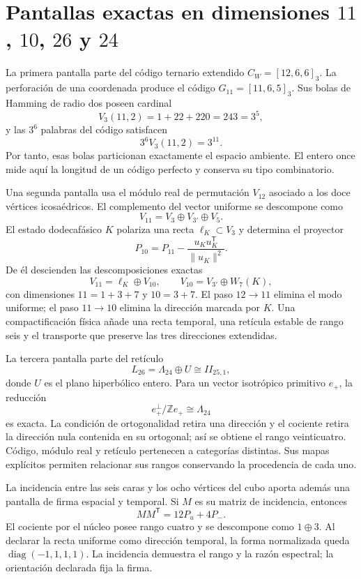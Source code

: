 \section{Pantallas exactas en dimensiones \(11\), \(10\), \(26\) y \(24\)}

La primera pantalla parte del código ternario extendido
\(C_W=[12,6,6]_3\). La perforación de una coordenada produce el código
\(G_{11}=[11,6,5]_3\). Sus bolas de Hamming de radio dos poseen cardinal
\[
 V_3(11,2)=1+22+220=243=3^5,
\]
y las \(3^6\) palabras del código satisfacen
\[
 3^6V_3(11,2)=3^{11}.
\]
Por tanto, esas bolas particionan exactamente el espacio ambiente. El entero
once mide aquí la longitud de un código perfecto y conserva su tipo
combinatorio.

Una segunda pantalla usa el módulo real de permutación \(V_{12}\) asociado a
los doce vértices icosaédricos. El complemento del vector uniforme se
descompone como
\[
 V_{11}=V_3\oplus V_{3'}\oplus V_5.
\]
El estado dodecafásico \(K\) polariza una recta \(\ell_K\subset V_3\) y
determina el proyector
\[
 P_{10}=P_{11}-\frac{u_Ku_K^{\mathsf T}}{\lVert u_K\rVert^2}.
\]
De él descienden las descomposiciones exactas
\[
 V_{11}=\ell_K\oplus V_{10},\qquad
 V_{10}=V_{3'}\oplus W_7(K),
\]
con dimensiones \(11=1+3+7\) y \(10=3+7\). El paso
\(12\to11\) elimina el modo uniforme; el paso \(11\to10\) elimina la
dirección marcada por \(K\). Una compactificación física añade una recta
temporal, una retícula estable de rango seis y el transporte que preserve las
tres direcciones extendidas.

La tercera pantalla parte del retículo
\[
 L_{26}=\Lambda_{24}\oplus U\cong II_{25,1},
\]
donde \(U\) es el plano hiperbólico entero. Para un vector isotrópico
primitivo \(e_+\), la reducción
\[
 e_+^\perp/\mathbb Ze_+\cong\Lambda_{24}
\]
es exacta. La condición de ortogonalidad retira una dirección y el cociente
retira la dirección nula contenida en su ortogonal; así se obtiene el rango
veinticuatro. Código, módulo real y retículo pertenecen a categorías
distintas. Sus mapas explícitos permiten relacionar sus rangos conservando la
procedencia de cada uno.

La incidencia entre las seis caras y los ocho vértices del cubo aporta además
una pantalla de firma espacial y temporal. Si \(M\) es su matriz de
incidencia, entonces
\[
 MM^{\mathsf T}=12P_u+4P_-.
\]
El cociente por el núcleo posee rango cuatro y se descompone como
\(1\oplus3\). Al declarar la recta uniforme como dirección temporal, la forma
normalizada queda \(\operatorname{diag}(-1,1,1,1)\). La incidencia demuestra
el rango y la razón espectral; la orientación declarada fija la firma.

